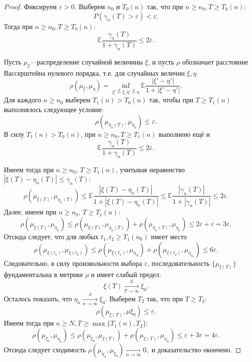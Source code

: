 \documentclass[12pt, a4paper, titlepage]{article}
\begin{document}
\begin{proof}
 Фиксируем $\varepsilon>0$. Выберем $n_0$ и $T_0(n)$
 так, что при $n \ge n_0, T \ge T_0(n)$:
 $$P(\gamma_n(T)>\varepsilon)<\varepsilon.$$
 Тогда при $n \ge n_0, T \ge T_0(n)$:
 $$\mathbb{E}\frac{\gamma_n(T)}{1+\gamma_n(T)} \le 2\varepsilon.$$
 
 Пусть $\mu_{\xi}$---распределение случайной величины $\xi$,
 и пусть $\rho$ обозначает расстояние Вассерштейна нулевого порядка, 
 т.е. для случайных величин $\xi, \eta$
 $$\rho(\mu_{\xi}, \mu_{\eta})=\inf\limits_{\xi'\stackrel{d}{=}\xi, \eta'\stackrel{d}{=}\eta}
  \mathbb{E}\frac{|\xi'-\eta'|}{1+|\xi'-\eta'|}.$$
 Для каждого $n \ge n_0$ выберем $T_1(n)>T_0(n)$ так, чтобы при $T \ge T_1(n)$ выполнялось следующее условие:
  $$\rho(\mu_{\eta_n(T)}, \mu_{\eta_n})\le \varepsilon.$$
 В силу $T_1(n)>T_0(n)$, при $n \ge n_0, T \ge T_1(n)$ выполнено ещё и
 $$\mathbb{E}\frac{\gamma_n(T)}{1+\gamma_n(T)}\le 2\varepsilon.$$

 Имеем тогда при $n \ge n_0$, $T\ge T_1(n)$, учитывая неравенство $|\xi(T)-\eta_n(T)|\le \gamma_n(T)$:
$$\rho(\mu_{\xi(T)},\mu_{\eta_n(T)})\le \mathbb{E}\frac{|\xi(T)-\eta_n(T)|}{1+|\xi(T)-\eta_n(T)|}\le
\mathbb{E}\frac{|\gamma_n(T)|}{1+|\gamma_n(T)|}\le 2\varepsilon.$$
Далее, имеем при $n \ge n_0$, $T\ge T_1(n)$:
$$\rho(\mu_{\xi(T)},\mu_{\eta_n})\le\rho(\mu_{\xi(T)}, \mu_{\eta_n(T)})+\rho(\mu_{\eta_n(T)},\mu_{\eta_n})
\le 2\varepsilon+\varepsilon = 3\varepsilon.$$
Отсюда следует, что для любых $t_1, t_2\ge T_1(n_0)$ имеет место
$$\rho(\mu_{\xi(t_1)}, \mu_{\xi(t_2)})\le \rho(\mu_{\xi(t_1)}, \mu_{\eta_N})+
\rho(\mu_{\xi(t_2)}, \mu_{\eta_{n_0}})\le 6 \varepsilon.$$
Следовательно, в силу произвольности выбора $\varepsilon$, последовательность
$\{\mu_{\xi(T)}\}$ фундаментальна в метрике $\rho$ и имеет слабый предел:
$$\xi(T)\xrightarrow[T\to\infty]{d} \xi_0.$$
Осталось показать, что $\eta_n\xrightarrow[n\to\infty]{d}\xi_0.$
Выберем $T_2$ так, что при $T\ge T_2$:
$$\rho(\mu_{\xi(T)}, \mu{\xi_0})\le \varepsilon.$$
Имеем тогда при $n\ge N, T\ge \max\{T_1(n), T_2\}$:
$$\rho(\mu_{\xi_0}, \mu_{\eta_n})
\le 
\rho(\mu_{\xi_0}, \mu_{\xi(T)})+
\rho(\mu_{\xi(T)}, \mu_{\eta_n})
\le
\varepsilon+3\varepsilon=4\varepsilon.$$
Отсюда следует сходимость $\rho(\mu_{\eta_n}, \mu_{\xi_0}) \xrightarrow[n\to\infty]{}0,$
и доказательство окончено.
\end{proof}
\end{document}
